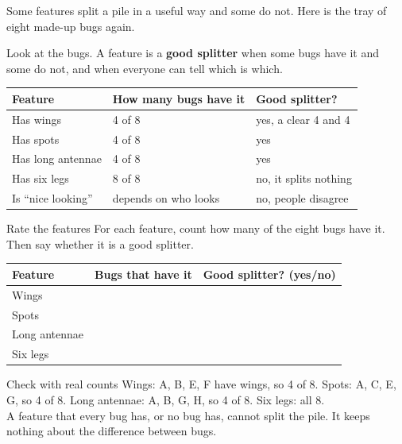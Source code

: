 \label{ch2}

Some features split a pile in a useful way and some do not. Here is the tray of eight made-up bugs again.

\bugtray

Look at the bugs. A feature is a \textbf{good splitter} when some bugs have it and some do not, and when everyone can tell which is which.

\begin{center}
\sffamily\small\renewcommand{\arraystretch}{1.5}
\begin{tabular}{@{}p{3.2cm}p{3.6cm}p{3.6cm}@{}}
\toprule
\textbf{Feature} & \textbf{How many bugs have it} & \textbf{Good splitter?}\\
\midrule
Has wings & 4 of 8 & yes, a clear 4 and 4\\
Has spots & 4 of 8 & yes\\
Has long antennae & 4 of 8 & yes\\
Has six legs & 8 of 8 & no, it splits nothing\\
Is ``nice looking'' & depends on who looks & no, people disagree\\
\bottomrule
\end{tabular}
\end{center}

\begin{tryit}{Rate the features}
For each feature, count how many of the eight bugs have it. Then say whether it is a good splitter.\par\medskip
\renewcommand{\arraystretch}{1.6}
\begin{tabular}{|l|c|c|}
\hline
\textbf{Feature} & \textbf{Bugs that have it} & \textbf{Good splitter? (yes/no)}\\ \hline
Wings & & \\ \hline
Spots & & \\ \hline
Long antennae & & \\ \hline
Six legs & & \\ \hline
\end{tabular}
\end{tryit}

\begin{worked}{Check with real counts}
Wings: A, B, E, F have wings, so 4 of 8. Spots: A, C, E, G, so 4 of 8. Long antennae: A, B, G, H, so 4 of 8. Six legs: all 8.\\
A feature that every bug has, or no bug has, cannot split the pile. It keeps nothing about the difference between bugs.
\end{worked}


